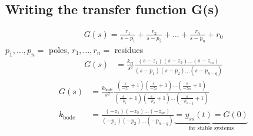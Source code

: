 \subsection{Writing the transfer function G(s)}
        \begin{align*}
            G(s) = \frac{r_1}{s-p_1} + \frac{r_2}{s-p_2} + \ldots + \frac{r_n}{s-p_n} + r_0
        \end{align*}
        $p_1, \ldots, p_n =$ poles, $r_1, \ldots, r_n =$ residues
        \begin{align*}
            G(s) &= \frac{k_{rl}}{s^q} \frac{(s-z_1)(s-z_2) \dots (s-z_m)}{(s-p_1)(s-p_2) \dots (s-p_{n-q})}
        \end{align*}
        \begin{align*}
            G(s) &= \frac{k_{bode}}{s^q} \frac{(\frac{s}{-z_1} + 1)(\frac{s}{-z_2} + 1) \dots (\frac{s}{-z_m} + 1)}{(\frac{s}{-p_1} + 1)(\frac{s}{-p_2} + 1) \dots (\frac{s}{-p_{n-q}} + 1)}\\
            k_{\text{bode}} &= \frac{(-z_1)(-z_2) \dots (-z_m)}{(-p_1)(-p_2) \dots (-p_{n-q})} \underbrace{= y_{ss}(t) = G(0)}_{\text{for stable systems}}
        \end{align*}
